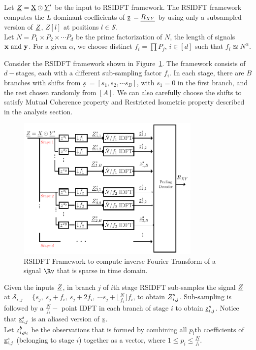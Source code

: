 \begin{enumerate}
	  Let $ \underline{Z}  =  \underline{\mathrm{X}} \odot \underline{Y}'$ be the input to RSIDFT framework. The RSIDFT framework computes the $L$ dominant coefficients of $\underline{\mathrm{z}}$ $= {\underline{R_{XY}}}$ by using only a subsampled version of $\underline{Z}$, $Z[l]$ at positions $l \in \mathcal{S}$.\\
	  Let $N = P_1 \times P_2 \times \cdots P_d$ be the prime factorization of $N$, the length of signals $\bf x \ \text{and} \ y$. For a given $\alpha$, we choose distinct $f_i = \prod P_j$, $i \in [d]$ such that $f_i \approxeq N^{\alpha} $. 
	 
	 Consider the RSIDFT framework shown in Figure~\ref{fig:rsidft}. The framework consists of $d-$stages, each with a different sub-sampling factor $f_i$. In each stage, there are $B$ branches with shifts from $\underline{s}\ = [s_1, s_2, \cdots s_B] $, with $s_1 =0$ in the first branch, and the rest chosen randomly from $[A]$. We can also carefully choose the shifts to satisfy Mutual Coherence property and Restricted Isometric property described in the analysis section.
	 
	 \begin{figure}
	 	\begin{center}
	 		\includegraphics[height=7cm]{Figures/FFAST_Robust} 
	 	\end{center}	   
	 	\caption{ RSIDFT Framework to compute inverse Fourier Transform of a signal $\Rv$ that is sparse in time domain. }\label{fig:rsidft}
	\vspace{5 pt}
	 \end{figure}	
	        
	
	 
	 Given the inputs $\underline{Z}$, in branch $j$ of $i$th stage RSIDFT sub-samples the signal $\underline{Z}$ at $\mathcal{S}_{i,j} = \{s_j,\ s_j + f_i,\ s_j + 2f_i,\ \cdots s_j + \lfloor{\frac{N}{f_i} }\rfloor f_i$, to obtain $\underline{Z}^{s}_{i,j}$. Sub-sampling is followed by a $\frac{N}{f_i}-$ point IDFT in each branch of stage $i$ to obtain $ \underline{\mathrm{z}}^{s}_{i,j}$. Notice that $ \underline{\mathrm{z}}^{s}_{i,j}$ is an aliased version of $\underline{\mathrm{z}}$. \\
	 Let $\underline{\mathrm{z}}^{b}_{i,p_i}$ be the observations that is formed by combining all $p_i$th coefficients of $\underline{\mathrm{z}}^{s}_{i,j}$ (belonging to stage $i$) together as a vector, where $1 \leq p_i \leq \frac{N}{f_i}$.
	 

\end{enumerate}
